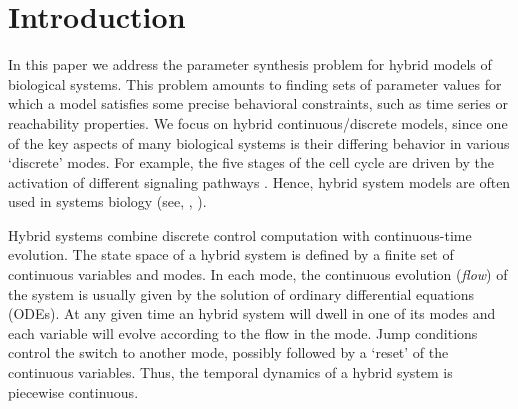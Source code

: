\section{Introduction}


In this paper we address the parameter synthesis problem for hybrid models of biological systems.
This problem amounts to finding sets of parameter values for which a model satisfies some precise 
behavioral constraints, such as time series or reachability properties. We focus on hybrid 
continuous/discrete models, since one of the key aspects of many biological systems is their differing 
behavior in various `discrete' modes. For example, the five stages of the cell cycle are driven 
by the activation of different signaling pathways \citep{thecell}. Hence, hybrid system models are often 
used in systems biology (see, \eg, \citep{tomlin04,ye08,aihara10,antoniotti03,lincoln04,baldazzi11}).

Hybrid systems combine discrete control computation with continuous-time evolution. The state space 
of a hybrid system is defined by a finite set of continuous variables and modes. In each mode, the
continuous evolution ({\em flow}) of the system is usually given by the solution of ordinary differential
equations (ODEs). At any given time an hybrid system will dwell in one of its modes and each variable 
will evolve according to the flow in the mode. Jump conditions control the switch to another mode,
possibly followed by a `reset' of the continuous variables. Thus, the temporal dynamics of a 
hybrid system is piecewise continuous.

